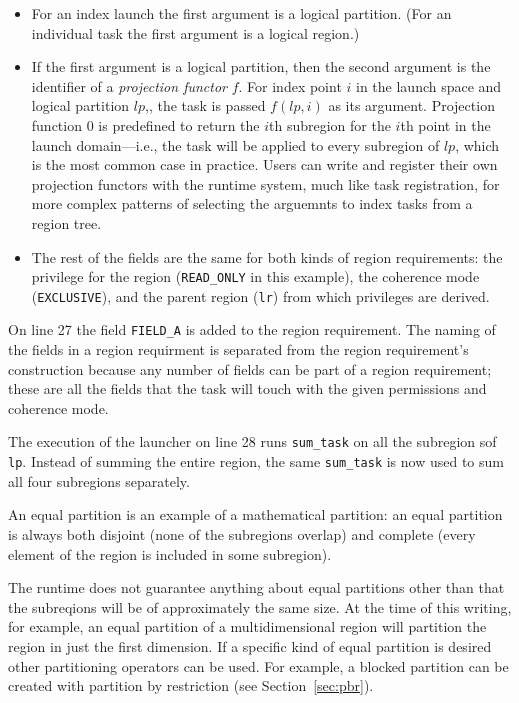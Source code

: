 \begin{itemize}
\item For an index launch the first argument is a logical partition. (For an individual task the first argument is a logical region.)

\item If the first argument is a logical partition, then the second argument is the identifier of a {\em projection functor} $f$. For index point $i$ in the launch space
  and logical partition $lp$,,
  the task is passed $f(lp,i)$ as its argument.   Projection function 0 is predefined to return the $i$th subregion for the $i$th point in the launch domain---i.e., the task will be applied to every subregion of $lp$, which is the most common case in practice. Users can write and register their own projection functors with the runtime
  system, much like task registration, for more complex patterns of selecting
  the arguemnts to index tasks from a region tree.

\item The rest of the fields are the same for both kinds of region requirements: the privilege for the region ({\tt READ\_ONLY} in this example), the coherence mode ({\tt EXCLUSIVE}), and the parent region ({\tt lr}) from which privileges are derived.
\end{itemize}
On line 27 the field {\tt FIELD\_A} is added to the region requirement.  The naming of the fields in a region requirment is separated from the region requirement's construction because any number of fields can be part of a region requirement; these are all the fields that the task will touch with the given permissions and coherence mode.

The execution of the launcher on line 28 runs {\tt sum\_task} on all the subregion sof {\tt lp}.  Instead of summing the entire region, the same {\tt sum\_task} is now used to sum all four subregions separately.


An equal partition is an example of a mathematical partition: an equal partition is always both disjoint (none of the subregions overlap) and complete (every element of the region is included in some subregion).

The runtime does not guarantee anything about equal partitions other than that the subreqions will be of approximately the same size.  At the time of this writing, for example, an equal partition of a multidimensional region will partition the region in just the first dimension.  If a specific kind of equal partition is desired other partitioning operators can be used.  For example, a blocked partition can be created with partition by restriction (see Section~\ref{sec:pbr}).




